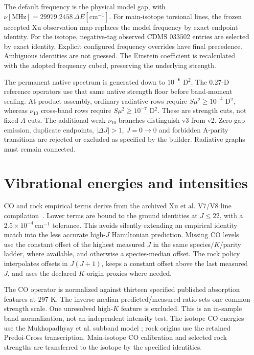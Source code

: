 \documentclass[11pt,a4paper]{article}
\newcommand{\smu}{S\mu^2}
\newcommand{\cm}{\,\mathrm{cm}^{-1}}
\begin{document}
The default frequency is the physical model gap, with
$\nu[\mathrm{MHz}]=29979.2458\,\Delta E[\mathrm{cm}^{-1}]$.
For main-isotope torsional lines, the frozen accepted Xu observation map
replaces the model frequency by exact endpoint identity. For the isotope,
negative-tag observed CDMS 033502 entries are selected by exact identity.
Explicit configured frequency overrides have final precedence. Ambiguous
identities are not guessed. The Einstein coefficient is recalculated with
the adopted frequency cubed, preserving the underlying strength.

The permanent native spectrum is generated down to $10^{-6}$ D$^2$.
The 0.27-D reference operators use that same native strength floor before
band-moment scaling. At product assembly, ordinary radiative rows require
$\smu\ge10^{-4}$ D$^2$, whereas $\nu_{10}$ cross-band rows require
$\smu\ge10^{-7}$ D$^2$. These are strength cuts, not fixed $A$ cuts.
The additional weak $\nu_{10}$ branches distinguish v3 from v2.
Zero-gap emission, duplicate endpoints, $|\Delta J|>1$, $J=0\to0$ and
forbidden A-parity transitions are rejected or excluded as specified by the
builder. Radiative graphs must remain connected.

\section{Vibrational energies and intensities}
CO and rock empirical terms derive from the archived Xu et al. V7/V8 line
compilation~\cite{Xu_2004}. Lower terms are bound to the ground identities
at $J\le22$, with a $2.5\times10^{-4}\cm$ tolerance. This avoids silently
extending an empirical identity match into the less accurate high-$J$
Hamiltonian prediction. Missing CO levels use the constant offset of the
highest measured $J$ in the same species/$K$/parity ladder, where available,
and otherwise a species-median offset. The rock policy interpolates offsets
in $J(J+1)$, keeps a constant offset above the last measured $J$, and uses
the declared $K$-origin proxies where needed.

The CO operator is normalized against thirteen specified published
absorption features at 297 K. The inverse median predicted/measured ratio
sets one common strength scale. One unresolved high-$K$ feature is excluded.
This is an in-sample band normalization, not an independent intensity test.
The isotope CO energies use the Mukhopadhyay et al. subband model
\cite{Mukhopadhyay_1995}; rock origins use the retained Predoi-Cross
transcription\cite{PredoiCross1997}. Main-isotope CO calibration and selected
rock strengths are transferred to the isotope by the specified identities.
\end{document}

